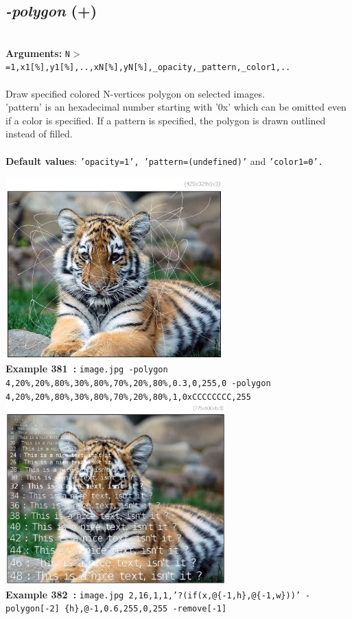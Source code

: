 \documentclass[a4paper,11pt,twoside]{book}
\begin{document}
\subsection{\emph{-polygon} (+)}\vspace*{-0.5em}
~\\\textbf{Arguments: } 
{\small \texttt{N$>$=1,x1[\%],y1[\%],..,xN[\%],yN[\%],\_opacity,\_pattern,\_color1,..}}\\~\\
Draw specified colored N-vertices polygon on selected images.
~\\'pattern' is an hexadecimal number starting with '0x' which can be omitted
even if a color is specified. If a pattern is specified, the polygon is
drawn outlined instead of filled.
~\\~\\\textbf{Default values}: {\small \texttt{'opacity=1', 'pattern=(undefined)'} and \texttt{'color1=0'.}}
\begin{center}\includegraphics[keepaspectratio=true,height=7cm,width=\textwidth]{img/gmic_def381.jpg}\\
{\footnotesize \textbf{Example 381~:} \texttt{image.jpg -polygon 4,20\%,20\%,80\%,30\%,80\%,70\%,20\%,80\%,0.3,0,255,0 -polygon 4,20\%,20\%,80\%,30\%,80\%,70\%,20\%,80\%,1,0xCCCCCCCC,255}}
\\\includegraphics[keepaspectratio=true,height=7cm,width=\textwidth]{img/gmic_def382.jpg}\\
{\footnotesize \textbf{Example 382~:} \texttt{image.jpg 2,16,1,1,'?(if(x,@\{-1,h\},@\{-1,w\}))' -polygon[-2] \{h\},@-1,0.6,255,0,255 -remove[-1]}}
\end{center}
\end{document}
